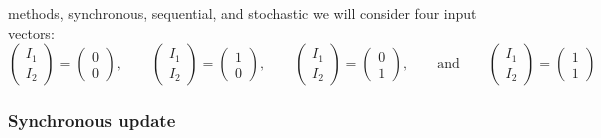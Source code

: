 methods, synchronous, sequential, and stochastic we will consider four input 
vectors:
\begin{equation*}
\begin{pmatrix}
I_1 \\ I_2
\end{pmatrix}
= 
\begin{pmatrix}
0 \\ 0
\end{pmatrix}, \qquad 
\begin{pmatrix}
I_1 \\ I_2
\end{pmatrix}
= 
\begin{pmatrix}
1 \\ 0
\end{pmatrix}, \qquad 
\begin{pmatrix}
I_1 \\ I_2
\end{pmatrix}
= 
\begin{pmatrix}
0 \\ 1
\end{pmatrix}, \qquad 
\mbox{and}  \qquad 
\begin{pmatrix}
I_1 \\ I_2
\end{pmatrix}
= 
\begin{pmatrix}
1 \\ 1
\end{pmatrix}
\end{equation*}

\subsubsection{Synchronous update} 

